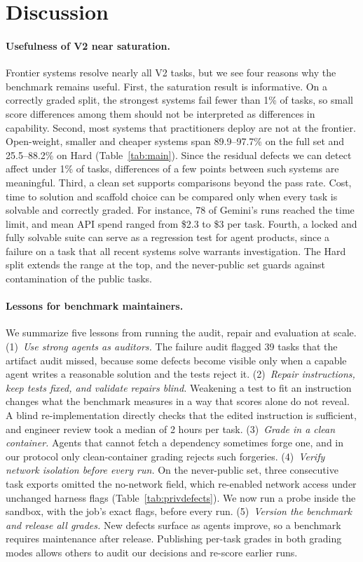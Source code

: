 \section{Discussion}
\label{sec:discussion}

\paragraph{Usefulness of V2 near saturation.} Frontier systems resolve nearly all V2 tasks, but we see four reasons why the benchmark remains useful. First, the saturation result is informative. On a correctly graded split, the strongest systems fail fewer than 1\% of tasks, so small score differences among them should not be interpreted as differences in capability. Second, most systems that practitioners deploy are not at the frontier. Open-weight, smaller and cheaper systems span 89.9--97.7\% on the full set and 25.5--88.2\% on Hard (Table~\ref{tab:main}). Since the residual defects we can detect affect under 1\% of tasks, differences of a few points between such systems are meaningful. Third, a clean set supports comparisons beyond the pass rate. Cost, time to solution and scaffold choice can be compared only when every task is solvable and correctly graded. For instance, 78 of Gemini's runs reached the time limit, and mean API spend ranged from \$2.3 to \$3 per task. Fourth, a locked and fully solvable suite can serve as a regression test for agent products, since a failure on a task that all recent systems solve warrants investigation. The Hard split extends the range at the top, and the never-public set guards against contamination of the public tasks.

\paragraph{Lessons for benchmark maintainers.} We summarize five lessons from running the audit, repair and evaluation at scale. (1)~\emph{Use strong agents as auditors.} The failure audit flagged 39 tasks that the artifact audit missed, because some defects become visible only when a capable agent writes a reasonable solution and the tests reject it. (2)~\emph{Repair instructions, keep tests fixed, and validate repairs blind.} Weakening a test to fit an instruction changes what the benchmark measures in a way that scores alone do not reveal. A blind re-implementation directly checks that the edited instruction is sufficient, and engineer review took a median of 2 hours per task. (3)~\emph{Grade in a clean container.} Agents that cannot fetch a dependency sometimes forge one, and in our protocol only clean-container grading rejects such forgeries. (4)~\emph{Verify network isolation before every run.} On the never-public set, three consecutive task exports omitted the no-network field, which re-enabled network access under unchanged harness flags (Table~\ref{tab:privdefects}). We now run a probe inside the sandbox, with the job's exact flags, before every run. (5)~\emph{Version the benchmark and release all grades.} New defects surface as agents improve, so a benchmark requires maintenance after release. Publishing per-task grades in both grading modes allows others to audit our decisions and re-score earlier runs.
